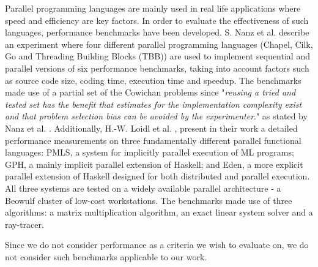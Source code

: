 Parallel programming languages are mainly used in real life applications where speed and efficiency are key factors. In order to evaluate the effectiveness of such languages, performance benchmarks have been developed. S. Nanz et al. \cite{MulticoreLangs} describe an experiment where four different parallel programming languages (Chapel, Cilk, Go and Threading Building Blocks (TBB)) are used to implement sequential and parallel versions of six performance benchmarks, taking into account factors such as source code size, coding time, execution time and speedup. The benchmarks made use of a partial set of the Cowichan problems \cite{CowichanProblems} since "\textit{reusing a tried and tested set has the benefit that
estimates for the implementation complexity exist and that
problem selection bias can be avoided by the experimenter}." as stated by Nanz et al. \cite{MulticoreLangs}. Additionally, H.-W. Loidl et al. \cite{ParallelFunctLangs}, present in their work a detailed performance measurements on three fundamentally different parallel functional languages: PMLS, a system for implicitly parallel execution of ML programs; GPH, a mainly implicit parallel extension of Haskell; and Eden, a more explicit parallel extension of Haskell designed for both distributed and parallel execution. All three systems are tested on a widely available parallel architecture - a Beowulf cluster of low-cost workstations. The benchmarks made use of three algorithms: a matrix multiplication algorithm, an exact linear system solver and a ray-tracer. 

Since we do not consider performance as a criteria we wish to evaluate on, we do not consider such benchmarks applicable to our work.

